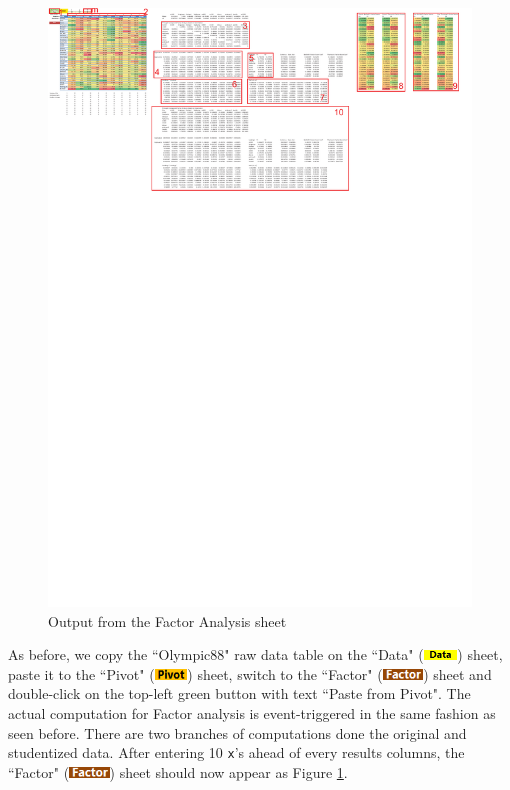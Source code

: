 \documentclass[article]{jss}
\numberwithin{equation}{subsection}
\newcommand{\shtData}{``Data" (\includegraphics[height=8pt, keepaspectratio=true]{DataSheetTab_png}) }
\newcommand{\shtPivot}{``Pivot" (\includegraphics[height=8pt, keepaspectratio=true]{PivotSheetTab_png}) }
\newcommand{\shtFactor}{``Factor" (\includegraphics[height=8pt, keepaspectratio=true]{FactorSheetTab_png}) }
\begin{document}
        \begin{figure}[!tbh]
                \includegraphics[width=\linewidth,keepaspectratio=true]{img/FactorSheetOutput_markup}
                \vspace{-20pt}\centering{}\protect\caption{Output from the Factor Analysis sheet}\label{fig:FactorSheetOutput_markup}
        \end{figure}
        
        As before, we copy the  ``Olympic88" raw data table on the \shtData sheet, paste it to the \shtPivot sheet, switch to the \shtFactor sheet and double-click on the top-left green button with text ``Paste from Pivot". The actual computation for Factor analysis is event-triggered in the same fashion as seen before. There are two branches of computations done the original and studentized data. After entering 10 \texttt{x}'s ahead of every results columns, the \shtFactor sheet should now appear as Figure \ref*{fig:FactorSheetOutput_markup}.
        
\end{document}
